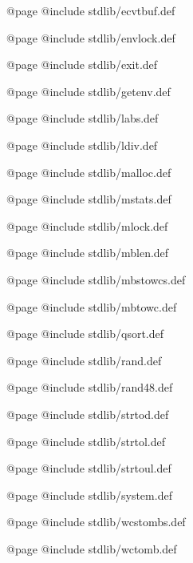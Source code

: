 @page
@include stdlib/ecvtbuf.def

@page
@include stdlib/envlock.def

@page
@include stdlib/exit.def

@page
@include stdlib/getenv.def

@page
@include stdlib/labs.def

@page
@include stdlib/ldiv.def

@page
@include stdlib/malloc.def

@page
@include stdlib/mstats.def

@page
@include stdlib/mlock.def

@page
@include stdlib/mblen.def

@page
@include stdlib/mbstowcs.def

@page
@include stdlib/mbtowc.def

@page
@include stdlib/qsort.def

@page
@include stdlib/rand.def

@page
@include stdlib/rand48.def

@page
@include stdlib/strtod.def

@page
@include stdlib/strtol.def

@page
@include stdlib/strtoul.def

@page
@include stdlib/system.def

@page
@include stdlib/wcstombs.def

@page
@include stdlib/wctomb.def

